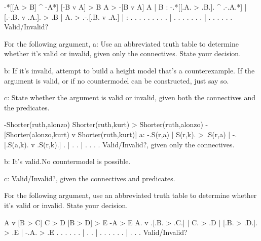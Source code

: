 \argument
 -*[[A > B] ^ -A*]
 [-B v A] > B
\argumentline
 A > -[B v A]
\endargument
        \answer
        \truthtable
         A | B : -.*[[.A. > .B.]. ^ .-.A.*] | [.-.B. v .A.]. > .B | A. > .-.[.B. v .A.]
        \truthtableline
           |   :  .   . .   . . .   . . .   |  . . .   . . .   .  |  .   . . . .   . 
        \endtruthtable
        Valid/Invalid?
        \endanswer

\endproblems

For the following argument,
\list
a: Use an abbreviated truth table to determine whether it's valid or invalid, given only the connectives. State your decision.

b: If it's invalid, attempt to build a height model that's a counterexample. If the argument is valid, or if no countermodel can be constructed, just say so.

c: State whether the argument is valid or invalid, given both the connectives and the predicates.
\endlist

\problems
{}
\argument
 -Shorter(ruth,alonzo)
 Shorter(ruth,kurt) > Shorter(ruth,alonzo)
\argumentline
 -[Shorter(alonzo,kurt) v Shorter(ruth,kurt)]
\endargument
        \answerlist
        a:
        \truthtable
         -.S(r,a) | S(r,k). > .S(r,a) | -.[.S(a,k). v .S(r,k).]
        \truthtableline
          .       |       .   .       |  . .      .   .
        \endtruthtable
        Valid/Invalid?, given only the connectives.

        b: It's valid.\OR No countermodel is possible.\OR
        \heightmodel
         
        \endheightmodel

        c: Valid/Invalid?, given the connectives and predicates.
        \endanswerlist

\endproblems

For the following argument, use an abbreviated truth table to determine whether it's valid or invalid. State your decision.

\problems
{}
\argument
 A v [B > C]
 C > D
 [B > D] > E
\argumentline
 -A > E
\endargument
        \answer
        \truthtable
         A. v .[.B. > .C.] | C. > .D | [.B. > .D.]. > .E | -.A. > .E
        \truthtableline
          .   . . .   . .  |  .   .  |  . .   . . .   .  |  . .   .
        \endtruthtable
        Valid/Invalid?
        \endanswer

\endproblems
\bye
